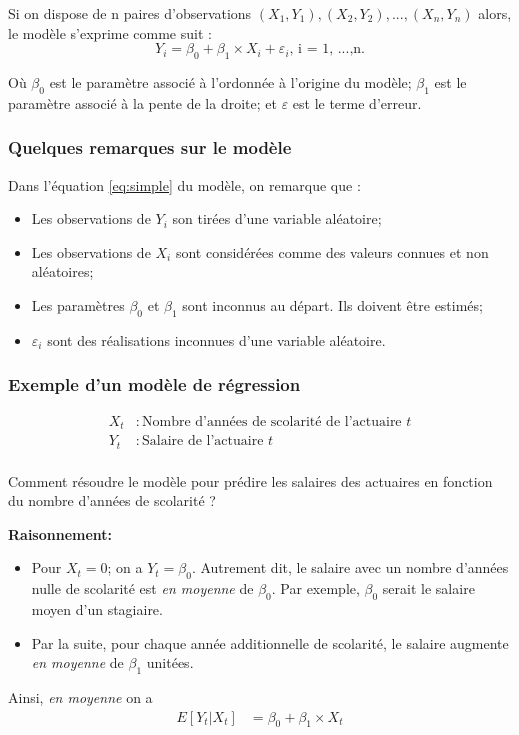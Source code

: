 \documentclass[11pt,french]{report}
\begin{document}
Si on dispose de n paires d'observations $(X_1, Y_1), (X_2, Y_2),...,(X_n, Y_n)$ alors, le modèle s'exprime  comme suit :
\begin{equation}
\label{eq:simple}
Y_i = \beta_0 + \beta_1\times X_i + \varepsilon_i \text{,  i = 1, ...,n.}
\end{equation}

Où $\beta_0$ est le paramètre associé à l'ordonnée à l'origine du modèle;
$\beta_1$ est le paramètre associé à la pente de la droite;
et $\varepsilon$ est le terme d'erreur.

\subsubsection*{Quelques remarques sur le modèle}
Dans l'équation \ref{eq:simple} du modèle, on remarque que :
\bigskip
\begin{itemize}
\item Les observations de $Y_i$ son tirées d'une variable aléatoire;
\item Les observations de $X_i$ sont considérées comme des valeurs connues et non aléatoires;
\item Les paramètres $\beta_0$ et $\beta_1$ sont inconnus au départ. Ils doivent être estimés;
\item $\varepsilon_i$ sont des réalisations inconnues d'une variable aléatoire.
\end{itemize}

\subsubsection*{Exemple d'un modèle de régression}
\begin{align*}
X_t &: \text{Nombre d'années de scolarité de l'actuaire } t \\
Y_t &: \text{Salaire de l'actuaire } t\\
\end{align*}

Comment résoudre le modèle pour prédire les salaires des actuaires en fonction du nombre d'années de scolarité ?

\bigskip
\textbf{Raisonnement:}
\begin{itemize}
\item Pour $X_t = 0$; on a $Y_t = \beta_0$. Autrement dit, le salaire avec un nombre d'années nulle de scolarité est \emph{en moyenne} de $\beta_0$. Par exemple, $\beta_0$ serait le salaire moyen d'un stagiaire.
\item Par la suite, pour chaque année additionnelle de scolarité, le salaire augmente \emph{en moyenne }de $\beta_1$ unitées.
\end{itemize}
\bigskip
Ainsi, \emph{en moyenne} on a 
\begin{align*}
E[Y_t|X_t] &= \beta_0 + \beta_1\times X_t
\end{align*}
\end{document}
